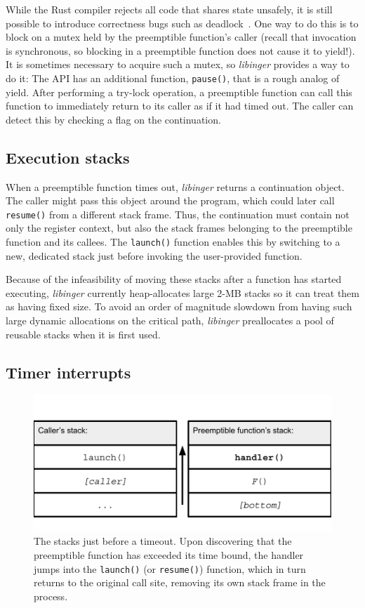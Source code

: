While the Rust compiler rejects all code that shares state unsafely, it is still
possible to introduce
correctness bugs such as deadlock~\cite{www-rustlang-nu}.  One way to do this is to
block on a mutex held by
the preemptible function's caller (recall that invocation is synchronous, so blocking
in a preemptible function does not cause it to yield!).  It is sometimes necessary to
acquire such a mutex, so \textit{libinger} provides a way to do it:  The API has an
additional function, \texttt{pause()}, that is a rough analog of yield.  After
performing a
try-lock operation, a preemptible function can call this function to immediately
return to its caller as if it had timed out.  The caller can detect this by checking
a flag on the continuation.


\subsection{Execution stacks}

When a preemptible function times out, \textit{libinger} returns a
continuation object.  The caller might pass this object around the program, which
could later call \texttt{resume()} from a different stack frame.  Thus, the
continuation must contain not only the register context, but also the stack
frames belonging to the preemptible function and its callees.  The \texttt{launch()}
function enables this by switching to a new, dedicated stack just before invoking the
user-provided function.

Because of the infeasibility of moving these stacks after a function has started
executing, \textit{libinger} currently heap-allocates large 2-MB stacks so it can
treat them as having fixed size.  To avoid an order of magnitude slowdown from having
such large dynamic allocations on the critical path, \textit{libinger} preallocates a
pool of reusable stacks when it is first used.


\subsection{Timer interrupts}
\label{sec:libinger:signals}

\begin{figure}
\includegraphics[width=\columnwidth]{figs/twostacks}
\caption{The stacks just before a timeout.  \textnormal{Upon discovering
that the preemptible function has exceeded its time bound, the handler jumps into the
\texttt{launch()} (or \texttt{resume()}) function, which in turn returns to the
original call site, removing its own stack frame in the process.}}
\label{fig:twostacks}
\end{figure}

